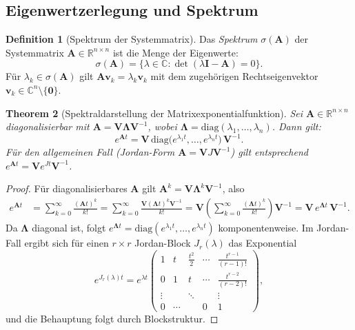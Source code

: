 \documentclass[a4paper, 12pt, twoside, openright]{report}
\newtheorem{theorem}{Theorem}[section]
\theoremstyle{definition}
\newtheorem{definition}[theorem]{Definition}
\theoremstyle{definition}
\newcommand{\R}{\mathbb{R}}
\newcommand{\C}{\mathbb{C}}
\newcommand{\vA}{\bm{A}}
\newcommand{\vI}{\bm{I}}
\newcommand{\vV}{\bm{V}}
\newcommand{\vLambda}{\bm{\Lambda}}
\newcommand{\spec}{\sigma}
\newcommand{\diag}{\mathrm{diag}}
\begin{document}
\subsection{Eigenwertzerlegung und Spektrum}

\begin{definition}[Spektrum der Systemmatrix]
Das \emph{Spektrum} $\spec(\vA)$ der Systemmatrix $\vA \in \R^{n \times n}$ ist die
Menge der Eigenwerte:
\begin{equation}
  \spec(\vA) = \{\lambda \in \C : \det(\lambda\vI - \vA) = 0\}.
  \label{eq:spektrum}
\end{equation}
Für $\lambda_k \in \spec(\vA)$ gilt $\vA\bm{v}_k = \lambda_k\bm{v}_k$ mit dem zugehörigen
Rechtseigenvektor $\bm{v}_k \in \C^n \setminus \{\bm{0}\}$.
\end{definition}

\begin{theorem}[Spektraldarstellung der Matrixexponentialfunktion]
\label{thm:spektralexp}
Sei $\vA \in \R^{n \times n}$ diagonalisierbar mit $\vA = \vV\vLambda\vV^{-1}$,
wobei $\vLambda = \diag(\lambda_1, \ldots, \lambda_n)$. Dann gilt:
\begin{equation}
  e^{\vA t} = \vV\,\diag\!\bigl(e^{\lambda_1 t},\ldots,e^{\lambda_n t}\bigr)\,\vV^{-1}.
  \label{eq:spektralexp}
\end{equation}
Für den allgemeinen Fall (Jordan-Form $\vA = \vV J \vV^{-1}$) gilt entsprechend
$e^{\vA t} = \vV e^{Jt} \vV^{-1}$.
\end{theorem}

\begin{proof}
Für diagonalisierbares $\vA$ gilt $\vA^k = \vV\vLambda^k\vV^{-1}$, also
\begin{align*}
  e^{\vA t} &= \sum_{k=0}^\infty \frac{(\vA t)^k}{k!}
             = \sum_{k=0}^\infty \frac{\vV(\vLambda t)^k\vV^{-1}}{k!}
             = \vV\!\left(\sum_{k=0}^\infty \frac{(\vLambda t)^k}{k!}\right)\!\vV^{-1}
             = \vV\,e^{\vLambda t}\,\vV^{-1}.
\end{align*}
Da $\vLambda$ diagonal ist, folgt $e^{\vLambda t} = \diag(e^{\lambda_1 t}, \ldots, e^{\lambda_n t})$
komponentenweise. Im Jordan-Fall ergibt sich für einen $r \times r$ Jordan-Block
$J_r(\lambda)$ das Exponential
\[
  e^{J_r(\lambda)t} = e^{\lambda t}\begin{pmatrix}
    1 & t & \frac{t^2}{2} & \cdots & \frac{t^{r-1}}{(r-1)!} \\
    0 & 1 & t & \cdots & \frac{t^{r-2}}{(r-2)!} \\
    \vdots & & \ddots & & \vdots \\
    0 & \cdots & & 0 & 1
  \end{pmatrix},
\]
und die Behauptung folgt durch Blockstruktur. \qedhere
\end{proof}
\end{document}
